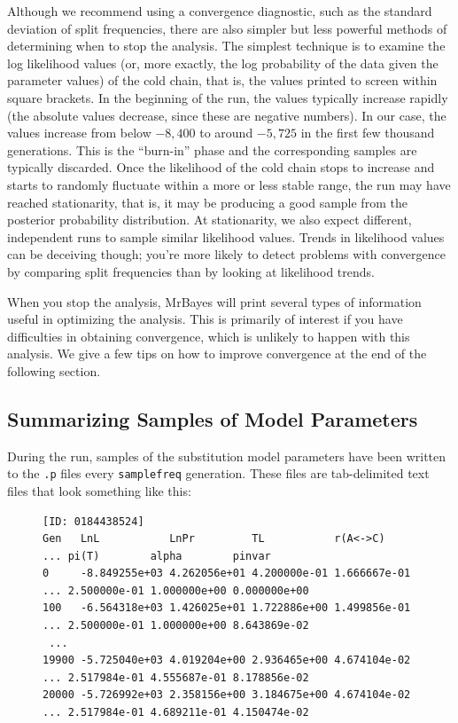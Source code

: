 \documentclass[12pt]{book}
\newcommand{\ttt}[1]{\texttt{#1}}
\begin{document}
Although we recommend using a convergence diagnostic, such as the standard deviation of split
frequencies, there are also simpler but less powerful methods of determining when to stop the
analysis. The simplest technique is to examine the log likelihood values (or, more exactly, the log
probability of the data given the parameter values) of the cold chain, that is, the values printed
to screen within square brackets. In the beginning of the run, the values typically increase
rapidly (the absolute values decrease, since these are negative numbers). In our case, the values
increase from below $-8,400$ to around $-5,725$ in the first few thousand generations. This is the
``burn-in'' phase and the corresponding samples are typically discarded. Once the likelihood of
the cold chain stops to increase and starts to randomly fluctuate within a more or less stable
range, the run may have reached stationarity, that is, it may be producing a good sample from the
posterior probability distribution. At stationarity, we also expect different, independent runs to
sample similar likelihood values. Trends in likelihood values can be deceiving though; you're more
likely to detect problems with convergence by comparing split frequencies than by looking at
likelihood trends.

When you stop the analysis, MrBayes will print several types of information useful in optimizing
the analysis. This is primarily of interest if you have difficulties in obtaining convergence,
which is unlikely to happen with this analysis. We give a few tips on how to improve convergence at
the end of the following section.

\subsection{Summarizing Samples of Model Parameters}

During the run, samples of the substitution model parameters have been written to the \ttt{.p}
files every \ttt{samplefreq} generation. These files are tab-delimited text files that look
something like this:

\begin{figure}[h]\singlespacing\scriptsize
\begin{verbatim}
[ID: 0184438524]
Gen   LnL           LnPr         TL           r(A<->C)     ... pi(T)        alpha        pinvar
0     -8.849255e+03 4.262056e+01 4.200000e-01 1.666667e-01 ... 2.500000e-01 1.000000e+00 0.000000e+00
100   -6.564318e+03 1.426025e+01 1.722886e+00 1.499856e-01 ... 2.500000e-01 1.000000e+00 8.643869e-02
 ...
19900 -5.725040e+03 4.019204e+00 2.936465e+00 4.674104e-02 ... 2.517984e-01 4.555687e-01 8.178856e-02
20000 -5.726992e+03 2.358156e+00 3.184675e+00 4.674104e-02 ... 2.517984e-01 4.689211e-01 4.150474e-02
\end{verbatim}\end{figure}
\end{document}
